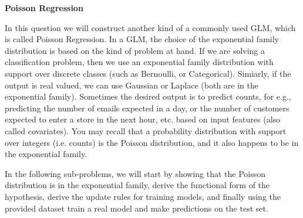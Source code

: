 \item {} {\bf Poisson Regression}

In this question we will construct another kind of a commonly used GLM, which is called Poisson Regression. In a GLM, the choice of the exponential family distribution is based on the kind of problem at hand. If we are solving a classification problem, then we use an exponential family distribution with support over discrete classes (such as Bernoulli, or Categorical). Simiarly, if the output is real valued, we can use Gaussian or Laplace (both are in the exponential family). Sometimes the desired output is to predict counts, for e.g., predicting the number of emails expected in a day, or the number of customers expected to enter a store in the next hour, etc. based on input features (also called covariates). You may recall that a probability distribution with support over integers (i.e. counts) is the Poisson distribution, and it also happens to be in the exponential family.

In the following sub-problems, we will start by showing that the Poisson distribution is in the exponential family, derive the functional form of the hypothesis, derive the update rules for training models, and finally using the provided dataset train a real model and make predictions on the test set.

\begin{enumerate}
	

\ifnum{}\fi

	


\ifnum{}\fi

	


\ifnum{}\fi

	


\ifnum{} {
  
} \fi

\end{enumerate}
